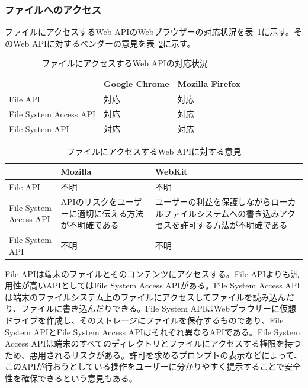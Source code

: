 \subsubsection{ファイルへのアクセス}
\label{subsubsection:ファイルへのアクセス}
ファイルにアクセスするWeb APIのWebブラウザーの対応状況を表~\ref{table:ファイルにアクセスするWeb APIの対応状況}に示す。そのWeb APIに対するベンダーの意見を表~\ref{table:ファイルにアクセスするWeb APIに対する意見}に示す。
\begin{table}
  \caption{ファイルにアクセスするWeb APIの対応状況}\label{table:ファイルにアクセスするWeb APIの対応状況}
  \centering
  \begin{tabular}{|p{13em}|p{8em}|p{8em}|}
    \hline
    & Google Chrome & Mozilla Firefox \\ \hline
    File API & \cellcolor{green!25}対応 & \cellcolor{green!25}対応 \\ \hline
    File System Access API & \cellcolor{green!25}対応 & \cellcolor{green!25}対応 \\ \hline
    File System API & \cellcolor{green!25}対応 & \cellcolor{green!25}対応 \\ \hline
  \end{tabular}
\end{table}
\begin{table}
  \caption{ファイルにアクセスするWeb APIに対する意見}
  \label{table:ファイルにアクセスするWeb APIに対する意見}
    \centering
    \begin{tabular}{|p{13em}|p{13em}|p{13em}|}
        \hline
        & Mozilla & WebKit \\ \hline
        File API & 不明 & 不明 \\ \hline
        File System Access API & \cellcolor{red!25}APIのリスクをユーザーに適切に伝える方法が不明確である\cite{MozillaFileSystemAccessAPI} & \cellcolor{red!25}ユーザーの利益を保護しながらローカルファイルシステムへの書き込みアクセスを許可する方法が不明確である~\cite{WebKitFileSystemAccessAPI} \\ \hline
        File System API & 不明 & 不明\\ \hline
    \end{tabular}
\end{table}
File APIは端末のファイルとそのコンテンツにアクセスする。File APIよりも汎用性が高いAPIとしてはFile System Access APIがある。File System Access APIは端末のファイルシステム上のファイルにアクセスしてファイルを読み込んだり、ファイルに書き込んだりできる。File System APIはWebブラウザーに仮想ドライブを作成し、そのストレージにファイルを保存するものであり、File System APIとFile System Access APIはそれぞれ異なるAPIである。File System Access APIは端末のすべてのディレクトリとファイルにアクセスする権限を持つため、悪用されるリスクがある。許可を求めるプロンプトの表示などによって、このAPIが行おうとしている操作をユーザーに分かりやすく提示することで安全性を確保できるという意見もある。
